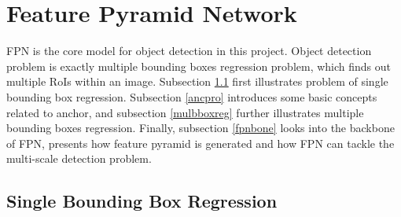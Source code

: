 \section{Feature Pyramid Network}\label{modfpn}

FPN is the core model for object detection in this project. Object detection problem is exactly multiple bounding boxes regression problem, which finds out multiple RoIs within an image. Subsection \ref{sglbboxreg} first illustrates problem of single bounding box regression. Subsection \ref{ancpro} introduces some basic concepts related to anchor, and subsection \ref{mulbboxreg} further illustrates multiple bounding boxes regression. Finally, subsection \ref{fpnbone} looks into the backbone of FPN, presents how feature pyramid is generated and how FPN can tackle the multi-scale detection problem.

\subsection{Single Bounding Box Regression}\label{sglbboxreg}

